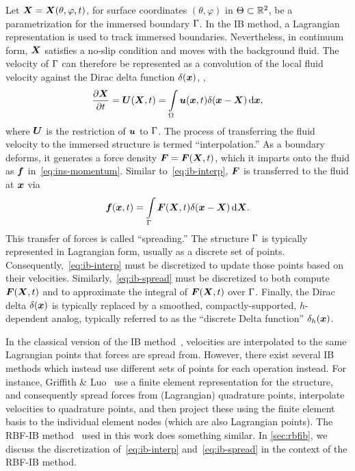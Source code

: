 Let $\boldsymbol{X} = \boldsymbol{X}(\theta, \varphi, t)$, for surface coordinates $(\theta, \varphi)$ in $\Theta\subset\mathbb{R}^2$, be a
parametrization for the immersed boundary $\Gamma$. In the IB method, a Lagrangian representation is used to
track immersed boundaries.  Nevertheless, in continuum form, $\boldsymbol{X}$ satisfies a no-slip condition and moves with the
background fluid. The velocity of $\Gamma$ can therefore be represented as a convolution of the local fluid
velocity against the Dirac delta function $\delta(\boldsymbol{x})$, ,
\begin{equation}\label{eq:ib-interp}
    \frac{\partial \X}{\partial t} = \U(\X, t) %
        = \int\limits_{\domain} \u(\x, t) \Dirac(\x-\X) \d\x,
\end{equation}
where $\boldsymbol{U}$ is the restriction of $\boldsymbol{u}$ to $\Gamma$.
The process of transferring the fluid velocity to the immersed structure is termed ``interpolation\qend.'' %
As a boundary deforms, it generates a force density $\boldsymbol{F} = \boldsymbol{F}(\boldsymbol{X}, t)$, which it imparts onto
the fluid as $\boldsymbol{f}$ in~\eqref{eq:ins-momentum}. Similar to~\eqref{eq:ib-interp}, $\boldsymbol{F}$ is transferred to the fluid at
$\boldsymbol{x}$ via
\begin{equation}\label{eq:ib-spread}
        \f(\x, t)
        = \int\limits_{\interface} \F(\X, t)\Dirac(\x-\X) \d\X.
\end{equation}
This transfer of forces is called ``spreading\qend.'' The structure $\Gamma$ is typically represented in
Lagrangian form, usually as a discrete set of points. Consequently,~\eqref{eq:ib-interp} must be discretized to
update those points based on their velocities. Similarly,~\eqref{eq:ib-spread} must be discretized to both compute
$\boldsymbol{F}(\boldsymbol{X}, t)$ and to approximate the integral of $\boldsymbol{F}(\boldsymbol{X}, t)$ over $\Gamma$. Finally, the Dirac delta
$\delta(\boldsymbol{x})$ is typically replaced by a smoothed, compactly-supported, $h$-dependent analog, typically referred to
as the ``discrete Delta function'' $\delta_h(\boldsymbol{x})$.

In the classical version of the IB method~\cite{Peskin:2002go}, velocities are interpolated to the same Lagrangian
points that forces are spread from.  However, there exist several IB methods which instead use different sets of
points for each operation instead. For instance, Griffith \& Luo~\cite{Griffith:2017id} use a finite element
representation for the structure, and consequently spread forces from (Lagrangian) quadrature points, interpolate
velocities to quadrature points, and then project these using the finite element basis to the individual element
nodes (which are also Lagrangian points). The RBF-IB method~\cite{Shankar:2015km} used in this work does something
similar. In \cref{sec:rbfib}, we discuss the discretization of~\eqref{eq:ib-interp} and~\eqref{eq:ib-spread} in
the context of the RBF-IB method.


